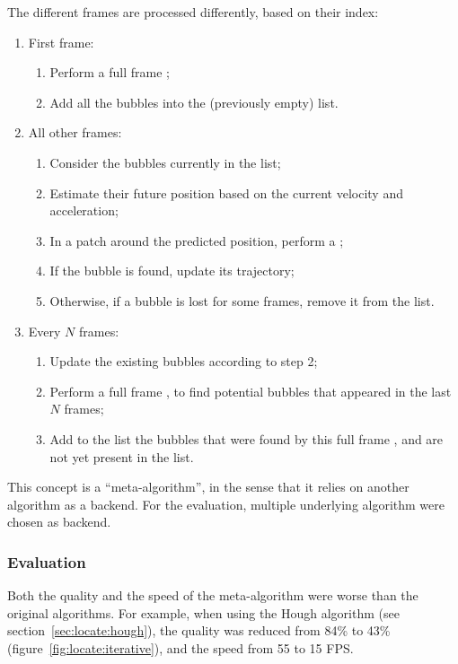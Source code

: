 The different frames are processed differently, based on their index:
\begin{enumerate}
	\itemsep 0em
	\item First frame:
	      \begin{enumerate}
		      \itemsep 0em
		      \item Perform a full frame \locate*;
		      \item Add all the bubbles into the (previously empty) list.
	      \end{enumerate}
	\item All other frames:
	      \begin{enumerate}
		      \itemsep 0em
		      \item Consider the bubbles currently in the list;
		      \item Estimate their future position based on the current velocity and acceleration;
		      \item In a patch around the predicted position, perform a \locate*;
		      \item If the bubble is found, update its trajectory;
		      \item Otherwise, if a bubble is lost for some frames, remove it from the list.
	      \end{enumerate}
	\item Every $N$ frames:
	      \begin{enumerate}
		      \itemsep 0em
		      \item Update the existing bubbles according to step 2;
		      \item Perform a full frame \locate*, to find potential bubbles that appeared in the last $N$ frames;
		      \item Add to the list the bubbles that were found by this full frame \locate*, and are not yet present in the list.
	      \end{enumerate}
\end{enumerate}

This concept is a ``meta-algorithm'', in the sense that it relies on another \locate* algorithm as a backend.
For the evaluation, multiple underlying algorithm were chosen as backend.

\subsubsection{Evaluation}

Both the quality and the speed of the meta-algorithm were worse than the original algorithms.
For example, when using the Hough algorithm (see section~\ref{sec:locate:hough}), the quality was reduced from 84\% to 43\% (figure~\ref{fig:locate:iterative}), and the speed from 55 to 15 FPS.

